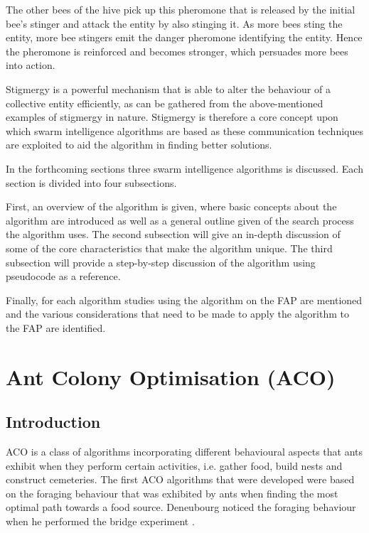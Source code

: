 The other bees of the hive pick up this pheromone that is released by the initial bee's stinger and attack the entity by also stinging it\cite{stigmergicoptimization}. As more bees sting the entity, more bee stingers emit the danger pheromone identifying the entity\cite{stigmergicoptimization}. Hence the pheromone is reinforced and becomes stronger, which persuades more bees into action\cite{stigmergicoptimization}.

Stigmergy is a powerful mechanism that is able to alter the behaviour of a collective entity efficiently, as can be gathered from the above-mentioned examples of stigmergy in nature\cite{AntsAndStigmergy,CompuIntelligenceIntro,AntIntroTrends}. Stigmergy is therefore a core concept upon which swarm intelligence algorithms are based as these communication techniques are exploited to aid the algorithm in finding better solutions\cite{AntsAndStigmergy,CompuIntelligenceIntro,AntIntroTrends}.

In the forthcoming sections three swarm intelligence algorithms is discussed. Each section is divided into four subsections. 

First, an overview of the algorithm is given, where basic concepts about the algorithm are introduced as well as a general outline given of the search process the algorithm uses. 
The second subsection will give an in-depth discussion of some of the core characteristics that make the algorithm unique. 
The third subsection will provide a step-by-step discussion of the algorithm using pseudocode as a reference.

Finally, for each algorithm studies using the algorithm on the \gls{FAP} are mentioned and the various considerations that need to be made to apply the algorithm to the \gls{FAP} are identified.

\section{Ant Colony Optimisation (ACO)}
\label{sec:ACO}
\subsection{Introduction}
\label{sec:ACOverview}
ACO is a class of algorithms incorporating different behavioural aspects that ants exhibit when they perform certain activities, i.e. gather food, build nests and construct cemeteries\cite{AntsAndStigmergy,CompuIntelligenceIntro}. The first \gls{ACO} algorithms that were developed were based on the foraging behaviour that was exhibited by ants when finding the most optimal path towards a food source. Deneubourg noticed the foraging behaviour when he performed the bridge experiment \cite{AntsAndStigmergy,CompuIntelligenceIntro}.

